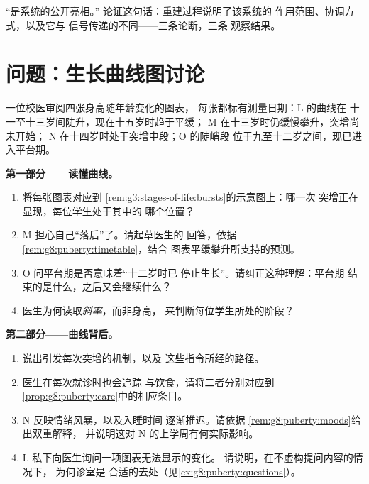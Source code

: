 \begin{exercise}[$\star\star\star$]\label{exo:g8:puberty:12}
“是系统的公开亮相。”
论证这句话：重建过程说明了该系统的
作用范围、协调方式，以及它与
信号传递的不同——三条论断，三条
观察结果。
\end{exercise}

\section{问题：生长曲线图讨论}

\begin{problem}\label{pb:g8:puberty:1}
一位校医审阅四张身高随年龄变化的图表，
每张都标有测量日期：L 的曲线在
十一至十三岁间陡升，现在十五岁时趋于平缓；
M 在十三岁时仍缓慢攀升，突增尚未开始；
N 在十四岁时处于突增中段；O 的陡峭段
位于九至十二岁之间，现已进入平台期。

\medskip\noindent\textbf{第一部分——读懂曲线。}
\begin{enumerate}
  \item 将每张图表对应到
        \cref{rem:g3:stages-of-life:bursts}的示意图上：哪一次
        突增正在显现，每位学生处于其中的
        哪个位置？
  \item M 担心自己“落后”了。请起草医生的
        回答，依据
        \cref{rem:g8:puberty:timetable}，结合
        图表平缓攀升所支持的预测。
  \item O 问平台期是否意味着“十二岁时已
        停止生长”。请纠正这种理解：平台期
        结束的是什么，之后又会继续什么？
  \item 医生为何读取\emph{斜率}，而非身高，
        来判断每位学生所处的阶段？
\end{enumerate}

\medskip\noindent\textbf{第二部分——曲线背后。}
\begin{enumerate}[resume]
  \item 说出引发每次突增的机制，以及
        这些指令所经的路径。
  \item 医生在每次就诊时也会追踪
        与饮食，请将二者分别对应到
        \cref{prop:g8:puberty:care}中的相应条目。
  \item N 反映情绪风暴，以及入睡时间
        逐渐推迟。请依据
        \cref{rem:g8:puberty:moods}给出双重解释，
        并说明这对 N 的上学周有何实际影响。
  \item L 私下向医生询问一项图表无法显示的变化。
        请说明，在不虚构提问内容的情况下，
        为何诊室是
        合适的去处（见\cref{ex:g8:puberty:questions}）。
\end{enumerate}


\end{problem}
